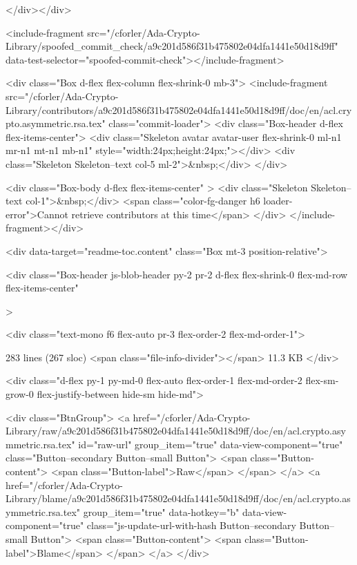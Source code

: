   
</div></div>

    <include-fragment src="/cforler/Ada-Crypto-Library/spoofed_commit_check/a9c201d586f31b475802e04dfa1441e50d18d9ff" data-test-selector="spoofed-commit-check"></include-fragment>

    <div class="Box d-flex flex-column flex-shrink-0 mb-3">
  <include-fragment src="/cforler/Ada-Crypto-Library/contributors/a9c201d586f31b475802e04dfa1441e50d18d9ff/doc/en/acl.crypto.asymmetric.rsa.tex" class="commit-loader">
    <div class="Box-header d-flex flex-items-center">
      <div class="Skeleton avatar avatar-user flex-shrink-0 ml-n1 mr-n1 mt-n1 mb-n1" style="width:24px;height:24px;"></div>
      <div class="Skeleton Skeleton--text col-5 ml-2">&nbsp;</div>
    </div>

    <div class="Box-body d-flex flex-items-center" >
      <div class="Skeleton Skeleton--text col-1">&nbsp;</div>
      <span class="color-fg-danger h6 loader-error">Cannot retrieve contributors at this time</span>
    </div>
</include-fragment></div>








  
    <div data-target="readme-toc.content" class="Box mt-3 position-relative">
      
  <div
    class="Box-header js-blob-header py-2 pr-2 d-flex flex-shrink-0 flex-md-row flex-items-center"
    
  >


  <div class="text-mono f6 flex-auto pr-3 flex-order-2 flex-md-order-1">

      283 lines (267 sloc)
      <span class="file-info-divider"></span>
    11.3 KB
  </div>

  <div class="d-flex py-1 py-md-0 flex-auto flex-order-1 flex-md-order-2 flex-sm-grow-0 flex-justify-between hide-sm hide-md">
      

    <div class="BtnGroup">
        <a href="/cforler/Ada-Crypto-Library/raw/a9c201d586f31b475802e04dfa1441e50d18d9ff/doc/en/acl.crypto.asymmetric.rsa.tex" id="raw-url" group_item="true" data-view-component="true" class="Button--secondary Button--small Button">    <span class="Button-content">
      <span class="Button-label">Raw</span>
    </span>
</a>  
          <a href="/cforler/Ada-Crypto-Library/blame/a9c201d586f31b475802e04dfa1441e50d18d9ff/doc/en/acl.crypto.asymmetric.rsa.tex" group_item="true" data-hotkey="b" data-view-component="true" class="js-update-url-with-hash Button--secondary Button--small Button">    <span class="Button-content">
      <span class="Button-label">Blame</span>
    </span>
</a>  
    </div>

